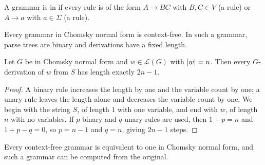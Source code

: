\documentclass[a4paper]{scrartcl}
\newcommand{\lang}{\mathcal{L}}
\begin{document}
\begin{definition}
	A grammar is in  if every rule is of the form $A \to BC$ with $B, C \in V$ (a  rule) or $A \to a$ with $a \in \Sigma$ (a  rule).
\end{definition}

Every grammar in Chomsky normal form is context-free. In such a grammar, parse trees are binary and derivations have a fixed length.

\begin{lemma}\label{lem:cnflength}
	Let $G$ be in Chomsky normal form and $w \in \lang(G)$ with $\lvert w\rvert = n$. Then every $G$-derivation of $w$ from $S$ has length exactly $2n - 1$.
\end{lemma}

\begin{proof}
	A binary rule increases the length by one and the variable count by one; a unary rule leaves the length alone and decreases the variable count by one. We begin with the string $S$, of length $1$ with one variable, and end with $w$, of length $n$ with no variables. If $p$ binary and $q$ unary rules are used, then $1 + p = n$ and $1 + p - q = 0$, so $p = n-1$ and $q = n$, giving $2n-1$ steps.
\end{proof}

\begin{theorem}[Chomsky]\label{thm:cnf}
	Every context-free grammar is equivalent to one in Chomsky normal form, and such a grammar can be computed from the original.
\end{theorem}
\end{document}
